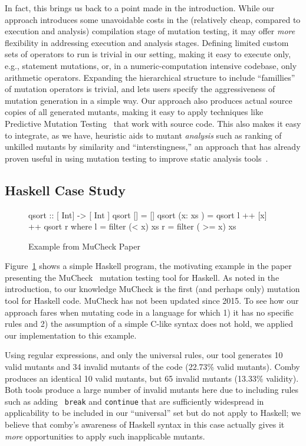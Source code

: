 \documentclass[sigconf,review, anonymous]{acmart}
\begin{document}
{In fact, this brings us back to a point made in the introduction.
While our approach introduces some unavoidable costs in the
(relatively cheap, compared to execution and analysis) compilation stage of
mutation testing, it may offer \emph{more} flexibility in addressing
execution and analysis stages.  Defining limited custom sets of
operators to run is trivial in our setting, making it easy to
execute only, e.g., statement mutations, or, in a numeric-computation
intensive codebase, only arithmetic operators.  Expanding the
hierarchical structure to include ``famillies'' of mutation operators
is trivial, and lets users specify the aggressiveness of mutation
generation in a simple way.  Our approach also produces actual source
copies of all generated mutants, making it easy to apply techniques
like Predictive Mutation Testing~\cite{zhangPMT} that work with source
code.  This also makes it easy to integrate, as we have, heuristic
aids to mutant \emph{analysis} such as ranking of unkilled mutants by
similarity and ``interstingness,'' an approach that has already proven
useful in using mutation testing to improve static analysis tools~\cite{StatMut}.

\subsection{Haskell Case Study}

\begin{figure}

  \begin{code}
 qsort :: [ Int] -> [ Int ]
 qsort [] = []
 qsort (x: xs ) = qsort l ++ [x] ++ qsort r
     where l = filter (< x) xs
           r = filter ( >= x) xs
\end{code}
\caption{Example from MuCheck Paper}
\label{fig:haskell}

\end{figure}

Figure~\ref{fig:haskell} shows a simple Haskell program, the
motivating example in the paper presenting the MuCheck~\cite{mucheck}
mutation testing tool for Haskell.  As noted in the introduction, to our
knowledge MuCheck is the first (and perhaps only) mutation tool for
Haskell code.  MuCheck has not been updated since 2015.
To see how our approach fares when mutating code in a language for
which 1) it has no specific rules and 2) the assumption of a simple
C-like syntax does not hold, we applied our implementation to this example.

Using regular expressions, and only the universal rules, our tool
generates 10 valid mutants and 34 invalid mutants of the code (22.73\%
valid mutants).  Comby produces an identical 10 valid mutants, but 65
invalid mutants (13.33\% validity).  Both tools produce a large number
of invalid mutants here due to including rules such as adding {\tt
  break} and {\tt continue} that are sufficiently widespread in
applicability to be included in our ``universal'' set but do not apply
to Haskell; we believe that comby's awareness of Haskell syntax in
this case actually gives it \emph{more} opportunities to apply such
inapplicable mutants.

}
\end{document}
